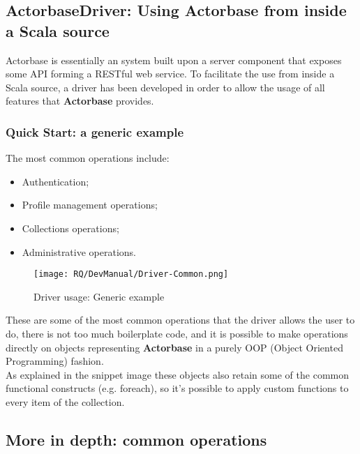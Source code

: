 \documentclass{scalatekids-article}
\begin{document}

\subsection{ActorbaseDriver: Using Actorbase from inside a Scala source}

Actorbase is essentially an  system built upon a server component
that exposes some API forming a RESTful web service. To facilitate the use from
inside a Scala source, a driver has been developed in order to allow the
usage of all features that \textbf{Actorbase} provides.\\

\subsubsection{Quick Start: a generic example}

The most common operations include:
\begin{itemize}
\item Authentication;
\item Profile management operations;
\item Collections operations;
\item Administrative operations.
\end{itemize}

\begin{figure}[H]
  \begin{center}
    \texttt{[image: RQ/DevManual/Driver-Common.png]}
    \caption{Driver usage: Generic example}
  \end{center}
\end{figure}

These are some of the most common operations that the driver allows the user to do,
there is not too much boilerplate code, and it is possible
to make operations directly on objects representing \textbf{Actorbase}
 in a purely OOP (Object Oriented Programming) fashion.\\
As explained in the snippet image these objects also retain some of the common functional constructs (e.g.
foreach), so it's possible to apply custom functions to every item of the
collection.

\subsection{More in depth: common operations}
\end{document}
